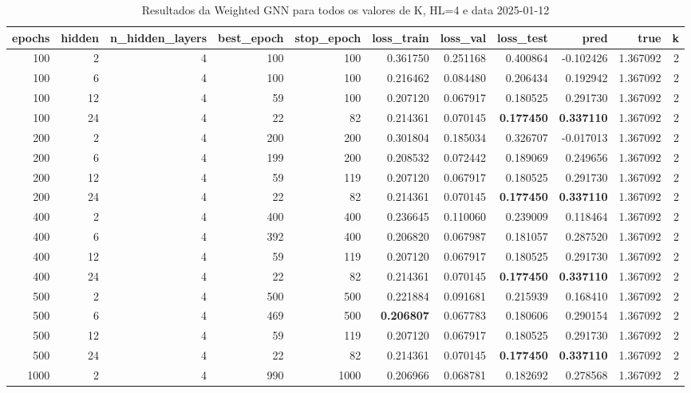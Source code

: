 \begin{table}
\caption{Resultados da Weighted GNN para todos os valores de K, HL=4 e data 2025-01-12}
\label{tab:weighted_gnn_results_allk_hl4_d20250112}
\begin{tabular}{rrrrrrrrrrr}
\toprule
epochs & hidden & n\_hidden\_layers & best\_epoch & stop\_epoch & loss\_train & loss\_val & loss\_test & pred & true & k \\
\midrule
100 & 2 & 4 & 100 & 100 & 0.361750 & 0.251168 & 0.400864 & -0.102426 & 1.367092 & 2 \\
100 & 6 & 4 & 100 & 100 & 0.216462 & 0.084480 & 0.206434 & 0.192942 & 1.367092 & 2 \\
100 & 12 & 4 & 59 & 100 & 0.207120 & 0.067917 & 0.180525 & 0.291730 & 1.367092 & 2 \\
100 & 24 & 4 & 22 & 82 & 0.214361 & 0.070145 & \textbf{0.177450} & \textbf{0.337110} & 1.367092 & 2 \\
200 & 2 & 4 & 200 & 200 & 0.301804 & 0.185034 & 0.326707 & -0.017013 & 1.367092 & 2 \\
200 & 6 & 4 & 199 & 200 & 0.208532 & 0.072442 & 0.189069 & 0.249656 & 1.367092 & 2 \\
200 & 12 & 4 & 59 & 119 & 0.207120 & 0.067917 & 0.180525 & 0.291730 & 1.367092 & 2 \\
200 & 24 & 4 & 22 & 82 & 0.214361 & 0.070145 & \textbf{0.177450} & \textbf{0.337110} & 1.367092 & 2 \\
400 & 2 & 4 & 400 & 400 & 0.236645 & 0.110060 & 0.239009 & 0.118464 & 1.367092 & 2 \\
400 & 6 & 4 & 392 & 400 & 0.206820 & 0.067987 & 0.181057 & 0.287520 & 1.367092 & 2 \\
400 & 12 & 4 & 59 & 119 & 0.207120 & 0.067917 & 0.180525 & 0.291730 & 1.367092 & 2 \\
400 & 24 & 4 & 22 & 82 & 0.214361 & 0.070145 & \textbf{0.177450} & \textbf{0.337110} & 1.367092 & 2 \\
500 & 2 & 4 & 500 & 500 & 0.221884 & 0.091681 & 0.215939 & 0.168410 & 1.367092 & 2 \\
500 & 6 & 4 & 469 & 500 & \textbf{0.206807} & 0.067783 & 0.180606 & 0.290154 & 1.367092 & 2 \\
500 & 12 & 4 & 59 & 119 & 0.207120 & 0.067917 & 0.180525 & 0.291730 & 1.367092 & 2 \\
500 & 24 & 4 & 22 & 82 & 0.214361 & 0.070145 & \textbf{0.177450} & \textbf{0.337110} & 1.367092 & 2 \\
1000 & 2 & 4 & 990 & 1000 & 0.206966 & 0.068781 & 0.182692 & 0.278568 & 1.367092 & 2 \\

\end{tabular}
\end{table}
